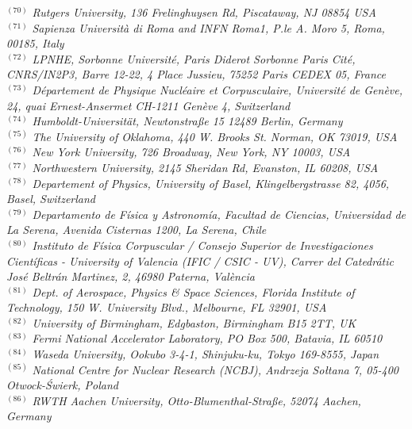 {\begin{center}
$^{(70)}$ \emph{Rutgers University, 136 Frelinghuysen Rd, Piscataway, NJ 08854 USA}\\
$^{(71)}$ \emph{Sapienza Universit\`a di Roma and INFN Roma1, P.le A. Moro 5, Roma, 00185, Italy}\\
$^{(72)}$ \emph{LPNHE, Sorbonne Universit{\'e}, Paris Diderot Sorbonne Paris Cit{\'e}, CNRS/IN2P3, Barre 12-22, 4 Place Jussieu, 75252 Paris CEDEX 05, France}\\
$^{(73)}$ \emph{D\'epartement de Physique Nucl\'eaire et Corpusculaire, Universit\'e de Gen\`eve, 24, quai Ernest-Ansermet CH-1211 Gen\`eve 4, Switzerland}\\
$^{(74)}$ \emph{Humboldt-Universit\"at, Newtonstra\ss e 15 12489 Berlin, Germany}\\
$^{(75)}$ \emph{The University of Oklahoma, 440 W. Brooks St. Norman, OK 73019, USA}\\
$^{(76)}$ \emph{New York University, 726 Broadway, New York, NY 10003, USA}\\
$^{(77)}$ \emph{Northwestern University, 2145 Sheridan Rd, Evanston, IL 60208, USA}\\
$^{(78)}$ \emph{Departement of Physics, University of Basel, Klingelbergstrasse 82, 4056, Basel, Switzerland}\\
$^{(79)}$ \emph{Departamento de F\' isica y Astronom\' ia, Facultad de Ciencias, Universidad de La Serena,  Avenida Cisternas 1200, La Serena, Chile}\\
$^{(80)}$ \emph{Instituto de F\'isica Corpuscular / Consejo Superior de Investigaciones Cient\'ificas - University of Valencia (IFIC / CSIC - UV), Carrer del Catedr\'atic Jos\'e Beltr\'an Martinez, 2, 46980 Paterna, Val\`encia}\\
$^{(81)}$ \emph{Dept. of Aerospace, Physics \& Space Sciences, Florida Institute of Technology, 150 W. University Blvd., Melbourne, FL 32901, USA}\\
$^{(82)}$ \emph{University of Birmingham, Edgbaston, Birmingham B15 2TT, UK}\\
$^{(83)}$ \emph{Fermi National Accelerator Laboratory, PO Box 500, Batavia, IL 60510}\\
$^{(84)}$ \emph{Waseda University, Ookubo 3-4-1, Shinjuku-ku, Tokyo 169-8555, Japan}\\
$^{(85)}$ \emph{National Centre for Nuclear Research (NCBJ), Andrzeja So\l{}tana 7, 05-400 Otwock-\'Swierk, Poland}\\
$^{(86)}$ \emph{RWTH Aachen University, Otto-Blumenthal-Stra\ss e, 52074 Aachen, Germany}\\

\end{center}}
